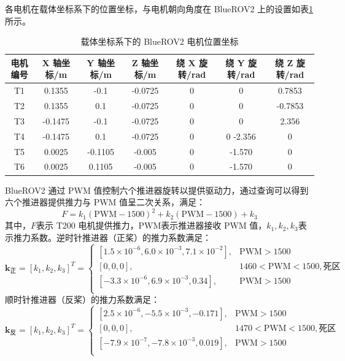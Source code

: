 各电机在载体坐标系下的位置坐标，与电机朝向角度在 BlueROV2 上的设置如表\ref{t.motor_position_rpy}所示。
\begin{table}[htb]
  \centering
  \caption{载体坐标系下的 BlueROV2 电机位置坐标}
  
  \label{t.motor_position_rpy}
  \begin{tabular}{c c c c c c c}
  \hline
电机编号 & X 轴坐标/m  & Y 轴坐标/m & Z 轴坐标/m & 绕 X 旋转/rad & 绕 Y 旋转/rad & 绕 Z 旋转/rad\\
\hline
T1 & 0.1355 & -0.1 & -0.0725 & 0 & 0 & 0.7853 \\
T2 & 0.1355 & 0.1 & -0.0725 & 0 & 0 & -0.7853 \\
T3 & -0.1475 & -0.1 & -0.0725 & 0 & 0 & 2.356\\
T4 & -0.1475 & 0.1 & -0.0725 & 0 & 0 -2.356 & 0\\
T5 & 0.0025 & -0.1105 & -0.005 & 0 & -1.570 & 0\\
T6 & 0.0025 & 0.1105 & -0.005 & 0 & -1.570 & 0\\
\hline
\end{tabular}
\end{table}
BlueROV2 通过 PWM 值控制六个推进器旋转以提供驱动力，通过查询可以得到六个推进器提供推力与 PWM 值呈二次关系，满足：
\begin{equation}
    F = k_1(\text{PWM}-1500)^2 + k_2(\text{PWM}-1500) + k_3
\end{equation}
其中，$F$表示 T200 电机提供推力，$\text{PWM}$表示推进器接收 PWM 值，$k_1,k_2,k_3$表示推力系数。逆时针推进器（正桨）的推力系数满足：
\begin{equation}
    \symbf{k}_\text{正} = [k_1,k_2,k_3]^T = \begin{cases}
  [1.5\times 10^{-6}, 6.0\times 10^{-3} ,7.1\times 10^{-2}], & \text{PWM}>1500 \\
  [0,0,0], & 1460<\text{PWM}<1500, \text{死区} \\
  [-3.3\times 10^{-6}, 6.9\times 10^{-3}, 0.34], & \text{PWM} > 1500 \\
\end{cases}
\end{equation}
顺时针推进器（反桨）的推力系数满足：
\begin{equation}
   \symbf{k}_\text{反} = [k_1,k_2,k_3]^T = \begin{cases}
  [2.5\times 10^{-6}, -5.5\times 10^{-3} ,-0.171], & \text{PWM}>1500 \\
  [0,0,0], & 1470<\text{PWM}<1500, \text{死区} \\
  [-7.9\times 10^{-7}, -7.8\times 10^{-3}, 0.019], & \text{PWM} > 1500 \\
\end{cases}
\end{equation}

